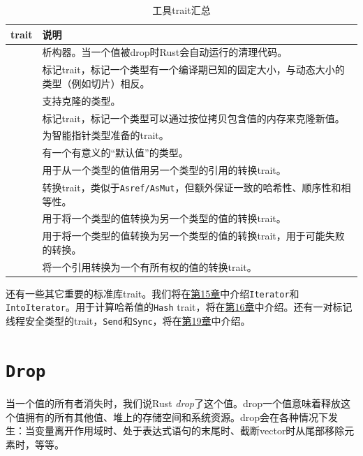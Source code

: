\begin{table}[htbp]
    \centering
    \caption{工具trait汇总}
    \label{t13-1}
    \begin{tabular}{p{}p{}}
        \hline
        \textbf{trait}  & \textbf{说明} \\
        \hline

        \nameref{drop}  & 析构器。当一个值被drop时Rust会自动运行的清理代码。    \\
        \rowcolor{tablecolor}
        \nameref{sized} & 标记trait，标记一个类型有一个编译期已知的固定大小，与动态大小的类型（例如切片）相反。 \\
        \nameref{clone} & 支持克隆的类型。  \\
        \rowcolor{tablecolor}
        \nameref{Copy}  & 标记trait，标记一个类型可以通过按位拷贝包含值的内存来克隆新值。   \\
        \nameref{deref} & 为智能指针类型准备的trait。   \\
        \rowcolor{tablecolor}
        \nameref{default}   & 有一个有意义的“默认值”的类型。    \\
        \nameref{asref} & 用于从一个类型的值借用另一个类型的引用的转换trait。   \\
        \rowcolor{tablecolor}
        \nameref{borrow}& 转换trait，类似于\texttt{Asref/AsMut}，但额外保证一致的哈希性、顺序性和相等性。   \\
        \nameref{from}  & 用于将一个类型的值转换为另一个类型的值的转换trait。   \\
        \rowcolor{tablecolor}
        \nameref{tryfrom}   & 用于将一个类型的值转换为另一个类型的值的转换trait，用于可能失败的转换。   \\
        \nameref{toowned}   & 将一个引用转换为一个有所有权的值的转换trait。 \\
    \end{tabular}
\end{table}

还有一些其它重要的标准库trait。我们将在\hyperref[ch15]{第15章}中介绍\texttt{Iterator}和\texttt{IntoIterator}。用于计算哈希值的\texttt{Hash} trait，将在\hyperref[ch16]{第16章}中介绍。还有一对标记线程安全类型的trait，\texttt{Send}和\texttt{Sync}，将在\hyperref[ch19]{第19章}中介绍。

\section{\texttt{Drop}}\label{drop}

当一个值的所有者消失时，我们说Rust \emph{drop}了这个值。drop一个值意味着释放这个值拥有的所有其他值、堆上的存储空间和系统资源。drop会在各种情况下发生：当变量离开作用域时、处于表达式语句的末尾时、截断vector时从尾部移除元素时，等等。

